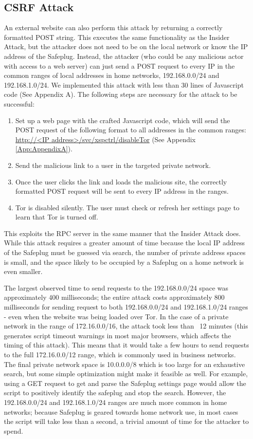 \documentclass[conference]{IEEEtran}
\begin{document}
\subsection{CSRF Attack}
An external website can also perform this attack by returning a correctly formatted POST string.  This executes the same functionality as the Insider Attack, but the attacker does not need to be on the local network or know the IP address of the Safeplug.  Instead, the attacker (who could be any malicious actor with access to a web server) can just send a POST request to every IP in the common ranges of local addresses in home networks, 192.168.0.0/24 and 192.168.1.0/24.  We implemented this attack with less than 30 lines of Javascript code (See Appendix A).  The following steps are necessary for the attack to be successful:

\begin{enumerate}
\item Set up a web page with the crafted Javascript code, which will send the POST request of the following format to all addresses in the common ranges: \url{http://<IP address>/svc/xspctrl/disableTor} (See Appendix \ref{App:AppendixA}).
\item Send the malicious link to a user in the targeted private network.
\item Once the user clicks the link and loads the malicious site, the correctly formatted POST request will be sent to every IP address in the ranges.  
\item Tor is disabled silently.  The user must check or refresh her settings page to learn that Tor is turned off.  
\end{enumerate}  

This exploits the RPC server in the same manner that the Insider Attack does.  While this attack requires a greater amount of time because the local IP address of the Safeplug must be guessed via search, the number of private address spaces is small, and the space likely to be occupied by a Safeplug on a home network is even smaller.  

The largest observed time to send requests to the 192.168.0.0/24 space was approximately 400 milliseconds; the entire attack costs approximately 800 milliseconds for sending request to both 192.168.0.0/24 and 192.168.1.0/24 ranges - even when the website was being loaded over Tor.  In the case of a private network in the range of 172.16.0.0/16, the attack took less than ~12 minutes (this generates script timeout warnings in most major browsers, which affects the timing of this attack).  This means that it would take a few hours to send requests to the full 172.16.0.0/12 range, which is commonly used in business networks.  The final private network space is 10.0.0.0/8 which is too large for an exhaustive search, but some simple optimization might make it feasible as well.  For example, using a GET request to get and parse the Safeplug settings page would allow the script to positively identify the safeplug and stop the search.  However, the 192.168.0.0/24 and 192.168.1.0/24 ranges are much more common in home networks; because Safeplug is geared towards home network use, in most cases the script will take less than a second, a trivial amount of time for the attacker to spend.  
\end{document}
